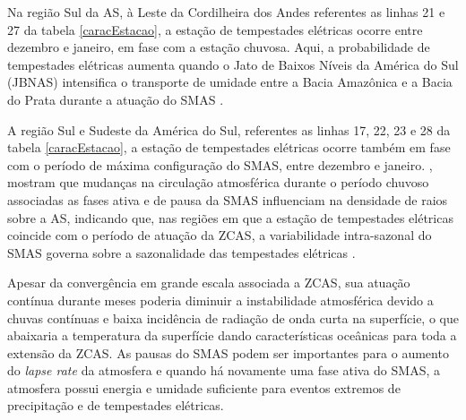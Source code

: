
Na região Sul da AS, à Leste da Cordilheira dos Andes referentes as linhas  21 e 27 da tabela \ref{caracEstacao}, a estação de tempestades elétricas ocorre entre dezembro e janeiro, em fase com a estação chuvosa. Aqui, a probabilidade de tempestades elétricas aumenta quando o Jato de Baixos Níveis da América do Sul (JBNAS) intensifica o transporte de umidade entre a Bacia Amazônica e a Bacia do Prata durante a atuação do SMAS \cite{marengo2004}.   

A região Sul e Sudeste da América do Sul, referentes as linhas 17, 22, 23 e 28 da tabela \ref{caracEstacao}, a estação de tempestades elétricas ocorre também em fase com o período de máxima configuração do SMAS, entre dezembro e janeiro. , mostram que mudanças na circulação atmosférica durante o período chuvoso associadas as fases ativa e de pausa da SMAS influenciam na densidade de raios sobre a AS, indicando que, nas regiões em que a estação de tempestades elétricas coincide com o período de atuação da ZCAS, a variabilidade intra-sazonal do SMAS  governa sobre a sazonalidade das tempestades elétricas \cite{CarvalhoJones2002,carvalho2004south}.

Apesar da convergência em grande escala associada a ZCAS, sua atuação contínua durante meses poderia diminuir a instabilidade atmosférica devido a chuvas contínuas e baixa incidência de radiação de onda curta na superfície, o que abaixaria a temperatura da superfície dando características oceânicas para toda a extensão da ZCAS. As pausas do SMAS podem ser importantes para o aumento do \textit{lapse rate} da atmosfera e quando há novamente uma fase ativa do SMAS, a atmosfera possui energia e umidade suficiente para eventos extremos de precipitação e de tempestades elétricas.


